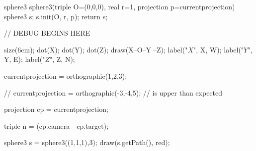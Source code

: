 sphere3 sphere3(triple O=(0,0,0), real r=1, projection p=currentprojection) {
	sphere3 s;
  	s.init(O, r, p);
  	return s;
}


// DEBUG BEGINS HERE

size(6cm);
dot(X);
dot(Y);
dot(Z);
draw(X--O--Y^^O--Z);
label("$X$", X, W);
label("$Y$", Y, E);
label("$Z$", Z, N);

currentprojection = orthographic(1,2,3);

// currentprojection = orthographic(-3,-4,5); // is upper than expected

projection cp = currentprojection;

triple n = (cp.camera - cp.target);

sphere3 s = sphere3((1,1,1),3);
draw(s.getPath(), red);
